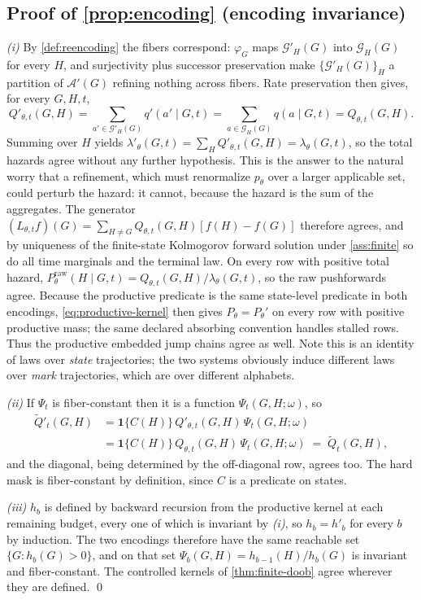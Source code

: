 \documentclass{article}
\newcommand{\A}{\mathcal{A}}
\newcommand{\one}{\mathbf{1}}
\newcommand{\Pmol}{P_{\theta}}
\newcommand{\Praw}{P^{\mathrm{raw}}_{\theta}}
\newcommand{\Gset}{\mathcal{G}}
\theoremstyle{definition}
\theoremstyle{remark}
\begin{document}
\subsection{Proof of \cref{prop:encoding} (encoding invariance)}

\emph{(i)} By \cref{def:reencoding} the fibers correspond: $\varphi_G$ maps $\Gset'_H(G)$ into $\Gset_H(G)$ for every $H$, and surjectivity plus successor preservation make $\{\Gset'_H(G)\}_H$ a partition of $\A'(G)$ refining nothing across fibers. Rate preservation then gives, for every $G,H,t$,
\[
Q'_{\theta,t}(G,H)=\!\!\sum_{a'\in\Gset'_H(G)}\!\!q'(a'\mid G,t)=\!\!\sum_{a\in\Gset_H(G)}\!\!q(a\mid G,t)=Q_{\theta,t}(G,H).
\]
Summing over $H$ yields $\lambda'_\theta(G,t)=\sum_H Q'_{\theta,t}(G,H)=\lambda_\theta(G,t)$, so the total hazards agree without any further hypothesis. This is the answer to the natural worry that a refinement, which must renormalize $p_\theta$ over a larger applicable set, could perturb the hazard: it cannot, because the hazard is the sum of the aggregates. The generator $(L_{\theta,t}f)(G)=\sum_{H\neq G}Q_{\theta,t}(G,H)[f(H)-f(G)]$ therefore agrees, and by uniqueness of the finite-state Kolmogorov forward solution under \cref{ass:finite} so do all time marginals and the terminal law. On every row with positive total hazard, $\Praw(H\mid G,t)=Q_{\theta,t}(G,H)/\lambda_\theta(G,t)$, so the raw pushforwards agree. Because the productive predicate is the same state-level predicate in both encodings, \eqref{eq:productive-kernel} then gives $\Pmol=\Pmol'$ on every row with positive productive mass; the same declared absorbing convention handles stalled rows. Thus the productive embedded jump chains agree as well. Note this is an identity of laws over \emph{state} trajectories; the two systems obviously induce different laws over \emph{mark} trajectories, which are over different alphabets.

\emph{(ii)} If $\Psi_t$ is fiber-constant then it is a function $\Psi_t(G,H;\omega)$, so
\begin{align*}
\widetilde Q'_t(G,H)&=\one\{C(H)\}\,Q'_{\theta,t}(G,H)\,\Psi_t(G,H;\omega)\\
&=\one\{C(H)\}\,Q_{\theta,t}(G,H)\,\Psi_t(G,H;\omega)\;=\;\widetilde Q_t(G,H),
\end{align*}
and the diagonal, being determined by the off-diagonal row, agrees too. The hard mask is fiber-constant by definition, since $C$ is a predicate on states.

\emph{(iii)} $h_b$ is defined by backward recursion from the productive kernel at each remaining budget, every one of which is invariant by \emph{(i)}, so $h_b=h'_b$ for every $b$ by induction. The two encodings therefore have the same reachable set $\{G:h_b(G)>0\}$, and on that set $\Psi_b(G,H)=h_{b-1}(H)/h_b(G)$ is invariant and fiber-constant. The controlled kernels of \cref{thm:finite-doob} agree wherever they are defined. \qed
\end{document}
